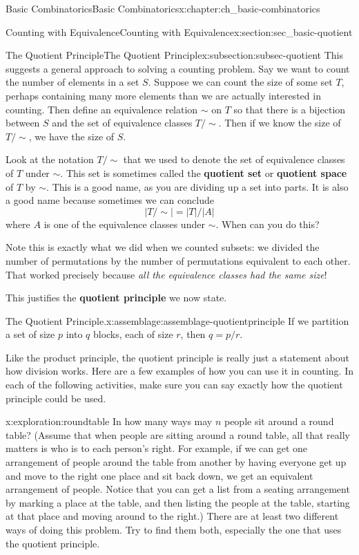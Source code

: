 \documentclass[oneside,10pt,]{book}
\newcommand{\terminology}[1]{\textbf{#1}}
\numberwithin{equation}{chapter}
\begin{document}
\begin{chapterptx}{Basic Combinatorics}{}{Basic Combinatorics}{}{}{x:chapter:ch_basic-combinatorics}
\begin{sectionptx}{Counting with Equivalence}{}{Counting with Equivalence}{}{}{x:section:sec_basic-quotient}
\begin{subsectionptx}{The Quotient Principle}{}{The Quotient Principle}{}{}{x:subsection:subsec-quotient}
This suggests a general approach to solving a counting problem.  Say we want to count the number of elements in a set \(S\).  Suppose we can count the size of some set \(T\), perhaps containing many more elements than we are actually interested in counting.  Then define an equivalence relation \(\sim\) on \(T\) so that there is a bijection between \(S\) and the set of equivalence classes \(T/\sim\).  Then if we know the size of \(T/\sim\), we have the size of \(S\).%
\par
Look at the notation \(T/\sim\) that we used to denote the set of equivalence classes of \(T\) under \(\sim\).  This set is sometimes called the \terminology{quotient set} or \terminology{quotient space} of \(T\) by \(\sim\).  This is a good name, as you are dividing up a set into parts.  It is also a good name because sometimes we can conclude%
\begin{equation*}
|T/\sim| = |T|/|A|
\end{equation*}
where \(A\) is one of the equivalence classes under \(\sim\).  When can you do this?%
\par
Note this is exactly what we did when we counted subsets: we divided the number of permutations by the number of permutations equivalent to each other.  That worked precisely because \emph{all the equivalence classes had the same size}!%
\par
This justifies the \terminology{quotient principle} we now state.%
\begin{assemblage}{The Quotient Principle.}{x:assemblage:assemblage-quotientprinciple}%
If we partition a set of size \(p\) into \(q\) blocks, each of size \(r\), then \(q = p/r\).%
\end{assemblage}
Like the product principle, the quotient principle is really just a statement about how division works.  Here are a few examples of how you can use it in counting.  In each of the following activities, make sure you can say exactly how the quotient principle could be used.%
\begin{exploration}{}{x:exploration:roundtable}%
In how many ways may \(n\) people sit around a round table? (Assume that when people are sitting around a round table, all that really matters is who is to each person's right. For example, if we can get one arrangement of people around the table from another by having everyone get up and move to the right one place and sit back down, we get an equivalent arrangement of people. Notice that you can get a list from a seating arrangement by marking a place at the table, and then listing the people at the table, starting at that place and moving around to the right.) There are at least two different ways of doing this problem. Try to find them both, especially the one that uses the quotient principle.%

\end{exploration}
\end{subsectionptx}
\end{sectionptx}
\end{chapterptx}
\end{document}
